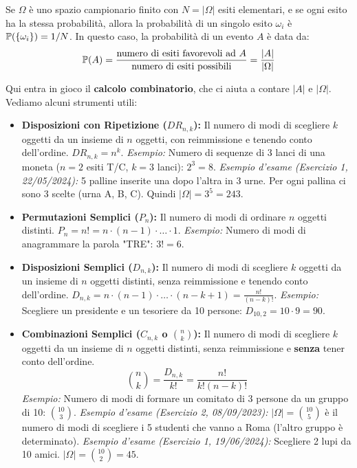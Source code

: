 \documentclass[12pt,a4paper]{article}
\begin{document}
Se $\Omega$ è uno spazio campionario finito con $N = |\Omega|$ esiti elementari, e se ogni esito ha la stessa probabilità, allora la probabilità di un singolo esito $\omega_i$ è $\mathbb{P}(\{\omega_i\}) = 1/N$.
In questo caso, la probabilità di un evento $A$ è data da:
\[ \mathbb{P}(A) = \frac{\text{numero di esiti favorevoli ad } A}{\text{numero di esiti possibili}} = \frac{|A|}{|\Omega|} \]

Qui entra in gioco il \textbf{calcolo combinatorio}, che ci aiuta a contare $|A|$ e $|\Omega|$.
Vediamo alcuni strumenti utili:

\begin{itemize}
    \item \textbf{Disposizioni con Ripetizione ($DR_{n,k}$):} Il numero di modi di scegliere $k$ oggetti da un insieme di $n$ oggetti, con reimmissione e tenendo conto dell'ordine. $DR_{n,k} = n^k$.
    \textit{Esempio:} Numero di sequenze di 3 lanci di una moneta ($n=2$ esiti T/C, $k=3$ lanci): $2^3=8$.
    \textit{Esempio d'esame (Esercizio 1, 22/05/2024):} 5 palline inserite una dopo l'altra in 3 urne. Per ogni pallina ci sono 3 scelte (urna A, B, C). Quindi $|\Omega| = 3^5 = 243$.

    \item \textbf{Permutazioni Semplici ($P_n$):} Il numero di modi di ordinare $n$ oggetti distinti. $P_n = n! = n \cdot (n-1) \cdot \dots \cdot 1$.
    \textit{Esempio:} Numero di modi di anagrammare la parola "TRE": $3! = 6$.

    \item \textbf{Disposizioni Semplici ($D_{n,k}$):} Il numero di modi di scegliere $k$ oggetti da un insieme di $n$ oggetti distinti, senza reimmissione e tenendo conto dell'ordine. $D_{n,k} = n \cdot (n-1) \cdot \dots \cdot (n-k+1) = \frac{n!}{(n-k)!}$.
    \textit{Esempio:} Scegliere un presidente e un tesoriere da 10 persone: $D_{10,2} = 10 \cdot 9 = 90$.

    \item \textbf{Combinazioni Semplici ($C_{n,k}$ o $\binom{n}{k}$):} Il numero di modi di scegliere $k$ oggetti da un insieme di $n$ oggetti distinti, senza reimmissione e \textbf{senza} tener conto dell'ordine.
    \[ \binom{n}{k} = \frac{D_{n,k}}{k!} = \frac{n!}{k!(n-k)!} \]
    \textit{Esempio:} Numero di modi di formare un comitato di 3 persone da un gruppo di 10: $\binom{10}{3}$.
    \textit{Esempio d'esame (Esercizio 2, 08/09/2023):} $|\Omega| = \binom{10}{5}$ è il numero di modi di scegliere i 5 studenti che vanno a Roma (l'altro gruppo è determinato).
    \textit{Esempio d'esame (Esercizio 1, 19/06/2024):} Scegliere 2 lupi da 10 amici. $|\Omega| = \binom{10}{2} = 45$.
\end{itemize}
\end{document}
